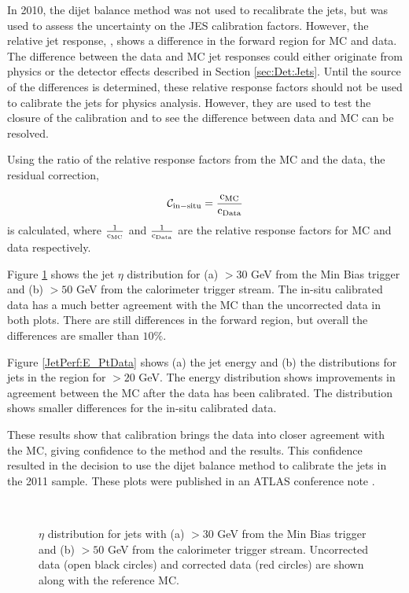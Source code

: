 In 2010, the dijet \pt{} balance method was not used to recalibrate the jets, but was used to assess the uncertainty on the JES calibration factors.
However, the relative jet response, \cite{ref:EtaInter2010}, shows a difference in the forward region for MC and data.
The difference between the data and MC jet responses could either originate from physics or the detector effects described in Section \ref{sec:Det:Jets}. 
Until the source of the differences is determined, these relative response factors should not be used to calibrate the jets for physics analysis.
However, they are used to test the closure of the calibration and to see the difference between data and MC can be resolved.

Using the ratio of the relative response factors from the MC and the data, the residual correction, 

\begin{equation}
\mathcal{C_{\rm{in-situ}}} = \frac{\rm{c_{MC}}}{\rm{c_{Data}}}
\label{JetPerf:ResidualCorrection}
\end{equation}
is calculated, where $\frac{1}{\rm{c_{MC}}}$ and $\frac{1}{\rm{c_{Data}}}$ are the relative response factors for MC and data respectively. 


Figure \ref{JetPerf:EtaData} shows the jet $\eta$ distribution for (a) \pt{}$>30$ GeV from the Min Bias trigger and (b) \pt{}$>50$ GeV from the calorimeter trigger stream. 
The in-situ calibrated data has a much better agreement with the MC than the uncorrected data in both plots. 
There are still differences in the forward region, but overall the differences are smaller than $10\%$.

Figure \ref{JetPerf:E_PtData} shows (a) the jet energy  and  (b) the \pt{} distributions  for jets in the region   for \pt{}$>20$ GeV. 
The energy distribution shows improvements in agreement between the MC after the data has been calibrated.
The \pt{} distribution shows smaller differences for the in-situ calibrated data.

These results show that calibration brings the data into  closer agreement with the MC, giving confidence to the method and the results.
This confidence resulted in the decision to use the dijet \pt{} balance method to calibrate the jets in the 2011 sample. 
These plots were published in an ATLAS conference note \cite{ref:EtaInter2010}.


\begin{figure}
\centering
\mbox{
              \quad
              \quad
}
\caption[Effect of additional calibration on the jet $\eta$ distribution]{
$\eta$ distribution for jets with (a) \pt{}$>30$ GeV from the Min Bias trigger and (b) \pt{}$>50$ GeV from the calorimeter trigger stream. 
Uncorrected data (open black circles) and corrected data (red circles) are shown along with the reference MC. 
\label{JetPerf:EtaData}}
\end{figure}

